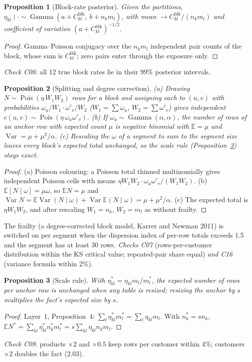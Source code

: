 \documentclass[11pt,a4paper]{article}
\newtheorem{proposition}{Proposition}
\theoremstyle{definition}
\theoremstyle{remark}
\newcommand{\E}{\mathbb{E}}
\newcommand{\Var}{\operatorname{Var}}
\newcommand{\Pois}{\operatorname{Pois}}
\newcommand{\Ga}{\operatorname{Gamma}}
\begin{document}
\begin{proposition}[Block-rate posterior]\label{prop:eta}
Given the partitions, $\eta_{kl}\mid\cdot\sim\Ga(a+C^{\mathrm{blk}}_{kl},\ b+n_km_l)$, with mean $\to C^{\mathrm{blk}}_{kl}/(n_km_l)$ and coefficient of variation $(a+C^{\mathrm{blk}}_{kl})^{-1/2}$.
\end{proposition}
\begin{proof}
Gamma--Poisson conjugacy over the $n_km_l$ independent pair counts of the block, whose sum is $C^{\mathrm{blk}}_{kl}$; zero pairs enter through the exposure only.
\end{proof}
\noindent\emph{Check C06}: all 12 true block rates lie in their 99\% posterior intervals.

\begin{proposition}[Splitting and degree correction]\label{prop:split}
(a) Drawing $N\sim\Pois(\eta\,W_1W_2)$ rows for a block and assigning each to $(u,v)$ with probabilities $\omega_u/W_1\cdot\omega'_v/W_2$ ($W_1=\sum\omega_u$, $W_2=\sum\omega'_v$) gives independent $c(u,v)\sim\Pois(\eta\,\omega_u\omega'_v)$.
(b) If $\omega_u\sim\Ga(\alpha,\alpha)$, the number of rows of an anchor row with expected count $\mu$ is negative binomial with $\E=\mu$ and $\Var=\mu+\mu^2/\alpha$.
(c) Rescaling the $\omega$ of a segment to sum to the segment size leaves every block's expected total unchanged, so the scale rule (Proposition~\ref{prop:scale}) stays exact.
\end{proposition}
\begin{proof}
(a) Poisson colouring: a Poisson total thinned multinomially gives independent Poisson cells with means $\eta W_1W_2\cdot\omega_u\omega'_v/(W_1W_2)$. (b) $\E[N\mid\omega]=\mu\omega$, so $\E N=\mu$ and $\Var N=\E\Var(N\mid\omega)+\Var\E(N\mid\omega)=\mu+\mu^2/\alpha$. (c) The expected total is $\eta W_1W_2$, and after rescaling $W_1=n_k$, $W_2=m_l$ as without frailty.
\end{proof}
The frailty (a degree-corrected block model, Karrer and Newman 2011) is switched on per segment when the dispersion index of per-row totals exceeds 1.5 and the segment has at least 30 rows. \emph{Checks C07} (rows-per-customer distribution within the KS critical value; repeated-pair share equal) \emph{and C16} (variance formula within 2\%).

\begin{proposition}[Scale rule]\label{prop:scale}
With $\eta^*_{kl}=\eta_{kl}m_l/m^*_l$, the expected number of rows per anchor row is unchanged when any table is resized; resizing the anchor by $s$ multiplies the fact's expected size by $s$.
\end{proposition}
\begin{proof}
Layer~1, Proposition~4: $\sum_l\eta^*_{kl}m^*_l=\sum_l\eta_{kl}m_l$. With $n^*_k=sn_k$, $\E N^*=\sum_{kl}\eta^*_{kl}n^*_km^*_l=s\sum_{kl}\eta_{kl}n_km_l$.
\end{proof}
\noindent\emph{Check C08}: products $\times2$ and $\times0.5$ keep rows per customer within 4\%; customers $\times2$ doubles the fact (2.03).
\end{document}
